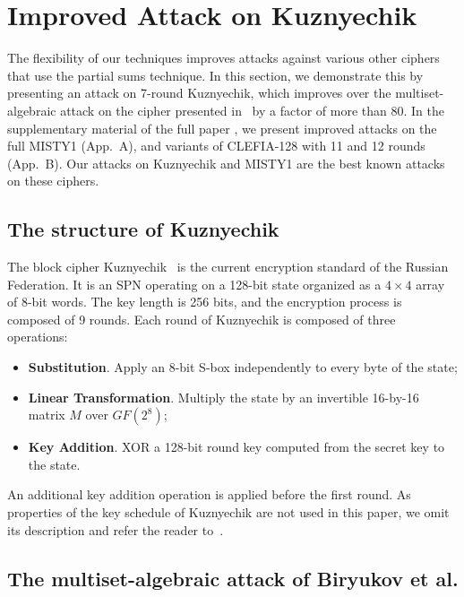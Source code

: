 \section{Improved Attack on Kuznyechik}\label{sec:other_target}

The flexibility of our techniques improves attacks against various other ciphers that use the partial sums technique. In this section, we demonstrate this by presenting an attack on 7-round Kuznyechik, which improves over the multiset-algebraic attack on the cipher presented in~\cite{TOSC:BirKhoPer16} by a factor of more than 80.  In the supplementary material of the full paper \cite{fullversion}, we present improved attacks on the full MISTY1 (App.~A), and variants of CLEFIA-128 with 11 and 12 rounds (App.~B). Our attacks on Kuznyechik and MISTY1 are the best known attacks on these ciphers. 

\subsection{The structure of Kuznyechik} 

The block cipher Kuznyechik~\cite{Kuznyechik} is the current encryption standard of the Russian Federation.  It is an SPN operating on a 128-bit state organized as a $4\times4$ array of 8-bit words. The key length is 256 bits, and the encryption process is composed of 9 rounds. Each round of Kuznyechik is composed of three operations: \begin{itemize} 
    \item[] \textbf{Substitution}. Apply an 8-bit S-box independently to every byte of the state; 
    \item[] \textbf{Linear Transformation}. Multiply the state by an invertible 16-by-16 matrix $M$ over $GF(2^8)$;
    \item[] \textbf{Key Addition}. XOR a 128-bit round key computed from the secret key to the state.
\end{itemize}
An additional key addition operation is applied before the first round. As properties of the key schedule of Kuznyechik are not used in this paper, we omit its description and refer the reader to~\cite{Kuznyechik}.

\subsection{The multiset-algebraic attack of Biryukov et al.} 

